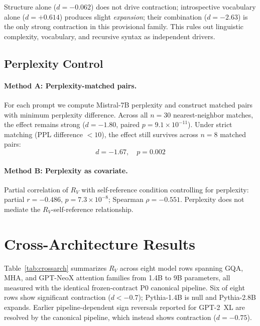 \documentclass{article}
\newcommand{\RV}{R_V}
\newcommand{\dcohen}{d}
\begin{document}
Structure alone ($\dcohen = -0.062$) does not drive contraction; introspective vocabulary
alone ($\dcohen = +0.614$) produces slight \emph{expansion}; their combination
($\dcohen = -2.63$) is the only strong contraction in this provisional family.
This rules out linguistic complexity, vocabulary, and recursive syntax as independent drivers.


\subsection{Perplexity Control}
\label{sec:ppl}


\paragraph{Method A: Perplexity-matched pairs.}
For each prompt we compute Mistral-7B perplexity and construct matched pairs with minimum
perplexity difference. Across all $n = 30$ nearest-neighbor matches, the effect remains strong
($\dcohen = -1.80$, paired $p = 9.1 \times 10^{-11}$).
Under strict matching (PPL difference $< 10$), the effect still survives across $n = 8$ matched pairs:
\begin{equation}
\dcohen = -1.67, \quad p = 0.002
\label{eq:ppl}
\end{equation}

\paragraph{Method B: Perplexity as covariate.}
Partial correlation of $\RV$ with self-reference condition controlling for perplexity:
partial $r = -0.486$, $p = 7.3 \times 10^{-8}$; Spearman $\rho = -0.551$.
Perplexity does not mediate the $\RV$-self-reference relationship.


\section{Cross-Architecture Results}
\label{sec:crossarch}

Table~\ref{tab:crossarch} summarizes $\RV$ across eight model rows spanning GQA, MHA,
and GPT-NeoX attention families from 1.4B to 9B parameters, all measured with the
identical frozen-contract P0 canonical pipeline.
Six of eight rows show significant contraction ($\dcohen < -0.7$);
Pythia-1.4B is null and Pythia-2.8B expands.
Earlier pipeline-dependent sign reversals reported for GPT-2~XL are resolved by the
canonical pipeline, which instead shows contraction ($\dcohen = -0.75$).
\end{document}
